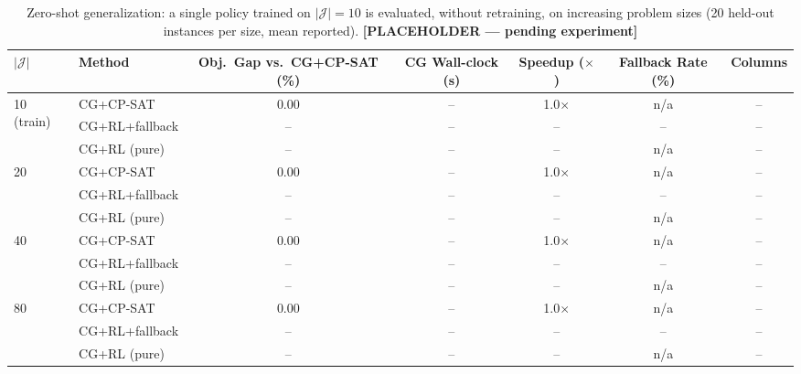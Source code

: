 \documentclass[11pt]{article}
\newcommand{\calJ}{\mathcal{J}}
\begin{document}
\begin{table}[h]
\centering
\caption{Zero-shot generalization: a single policy trained on $|\calJ|=10$ is evaluated, without retraining, on increasing problem sizes (20 held-out instances per size, mean reported). \textbf{[PLACEHOLDER --- pending experiment]}}
\label{tab:generalization}
\begin{tabular}{llccccc}
\toprule
$|\calJ|$ & Method & Obj.\ Gap vs.\ CG+CP-SAT (\%) & CG Wall-clock (s) & Speedup ($\times$) & Fallback Rate (\%) & Columns \\
\midrule
\multirow{3}{*}{10 (train)}
  & CG+CP-SAT      & 0.00 & -- & 1.0$\times$ & n/a & -- \\
  & CG+RL+fallback & --   & -- & --          & --  & -- \\
  & CG+RL (pure)   & --   & -- & --          & n/a & -- \\
\midrule
\multirow{3}{*}{20}
  & CG+CP-SAT      & 0.00 & -- & 1.0$\times$ & n/a & -- \\
  & CG+RL+fallback & --   & -- & --          & --  & -- \\
  & CG+RL (pure)   & --   & -- & --          & n/a & -- \\
\midrule
\multirow{3}{*}{40}
  & CG+CP-SAT      & 0.00 & -- & 1.0$\times$ & n/a & -- \\
  & CG+RL+fallback & --   & -- & --          & --  & -- \\
  & CG+RL (pure)   & --   & -- & --          & n/a & -- \\
\midrule
\multirow{3}{*}{80}
  & CG+CP-SAT      & 0.00 & -- & 1.0$\times$ & n/a & -- \\
  & CG+RL+fallback & --   & -- & --          & --  & -- \\
  & CG+RL (pure)   & --   & -- & --          & n/a & -- \\
\bottomrule
\end{tabular}
\end{table}
\end{document}
